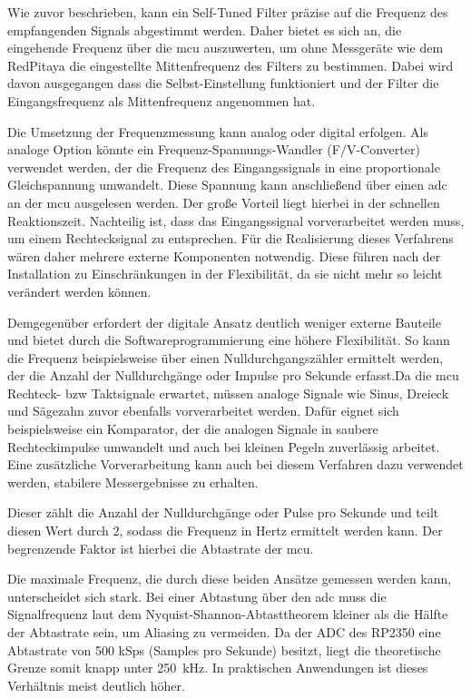 \documentclass[../main.tex]{subfiles}
\begin{document}
Wie zuvor beschrieben, kann ein Self-Tuned Filter präzise auf die Frequenz des empfangenden Signals abgestimmt werden. Daher bietet es sich an, die eingehende Frequenz über die \gls{mcu}  auszuwerten, um ohne Messgeräte wie dem RedPitaya die eingestellte Mittenfrequenz des Filters zu bestimmen. Dabei wird davon ausgegangen dass die Selbst-Einstellung funktioniert und der Filter die Eingangsfrequenz als Mittenfrequenz angenommen hat.\par
\medskip
Die Umsetzung der Frequenzmessung kann analog oder digital erfolgen. Als  analoge Option könnte ein Frequenz-Spannungs-Wandler (F/V-Converter) verwendet werden, der die Frequenz des Eingangssignals in eine proportionale Gleichspannung umwandelt. Diese Spannung kann anschließend über einen \gls{adc} an der \gls{mcu} ausgelesen werden. Der große Vorteil liegt hierbei in der schnellen Reaktionszeit. Nachteilig ist, dass das Eingangssignal vorverarbeitet werden muss, um einem Rechtecksignal zu entsprechen. Für die Realisierung dieses Verfahrens wären daher mehrere externe Komponenten notwendig. Diese führen nach der Installation zu Einschränkungen in der Flexibilität, da sie nicht mehr so leicht verändert werden können.\par
\medskip
Demgegenüber erfordert der digitale Ansatz deutlich weniger externe Bauteile und bietet durch die Softwareprogrammierung eine höhere Flexibilität. So kann die Frequenz beispielsweise über einen Nulldurchgangszähler ermittelt werden, der die Anzahl der Nulldurchgänge oder Impulse pro Sekunde erfasst.Da die \gls{mcu} Rechteck- bzw Taktsignale erwartet, müssen analoge Signale wie Sinus, Dreieck und Sägezahn zuvor ebenfalls vorverarbeitet werden. Dafür eignet sich beispielsweise ein Komparator, der die analogen Signale in saubere Rechteckimpulse umwandelt und auch bei kleinen Pegeln zuverlässig arbeitet. Eine zusätzliche Vorverarbeitung kann auch bei diesem Verfahren dazu verwendet werden, stabilere Messergebnisse zu erhalten. \par
\medskip


Dieser zählt die Anzahl der Nulldurchgänge oder Pulse pro Sekunde und teilt diesen Wert durch 2, sodass die Frequenz in Hertz ermittelt werden kann. Der begrenzende Faktor ist hierbei die Abtastrate der \gls{mcu}. \par
\medskip



Die maximale Frequenz, die durch diese beiden Ansätze gemessen werden kann, unterscheidet sich stark. Bei einer Abtastung über den \gls{adc} muss die Signalfrequenz laut dem Nyquist-Shannon-Abtasttheorem kleiner als die Hälfte der Abtastrate sein, um Aliasing zu vermeiden. Da der ADC des RP2350 eine Abtastrate von 500 kSps (Samples pro Sekunde) besitzt, liegt die theoretische Grenze somit knapp unter \SI{250}{\kilo\hertz}. In praktischen Anwendungen ist dieses Verhältnis meist deutlich höher. \par
\medskip
\end{document}
